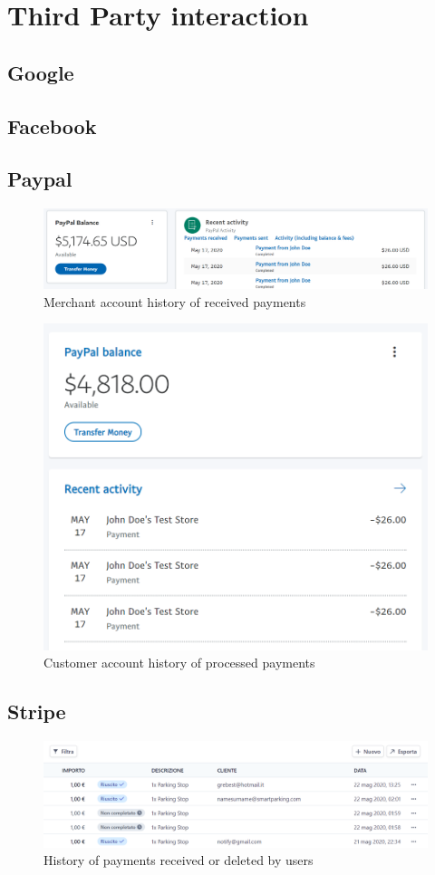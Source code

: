 \documentclass[11pt]{article} %
\begin{document}
\section{Third Party interaction}
\subsection{Google}
\subsection{Facebook}
\subsection{Paypal}
\begin{figure}[H]
\centering
\includegraphics[scale=0.5]{paypal_merchant.png}
\caption{Merchant account history of received payments}
\end{figure}
\begin{figure}[H]
\centering
\includegraphics[scale=0.5]{paypal_customer.png}
\caption{Customer account history of processed payments}
\end{figure}
\subsection{Stripe}
\begin{figure}[H]
\centering
\includegraphics[scale=0.5]{stripe.png}
\caption{History of payments received or deleted by users}
\end{figure}
\end{document}
